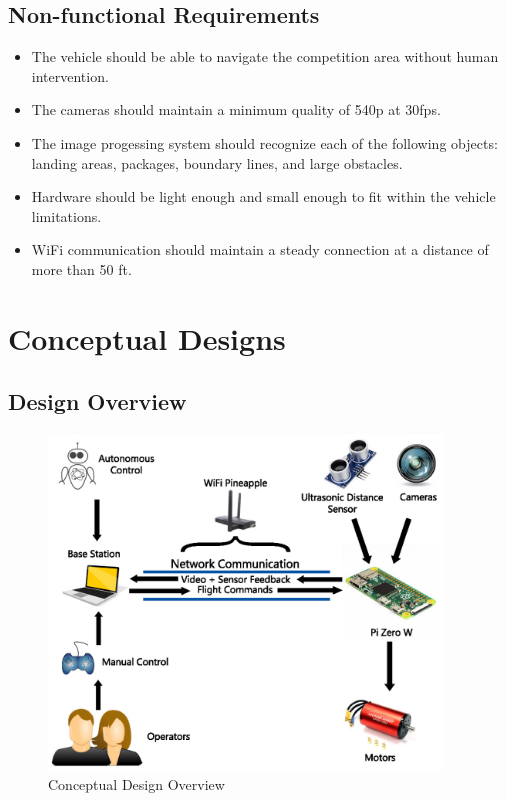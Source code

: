 \documentclass[onecolumn, draftclsnofoot,10pt, compsoc]{IEEEtran}
\begin{document}
\subsection{Non-functional Requirements} 

\begin{itemize}
\item{The vehicle should be able to navigate the competition area without human intervention.}
\item{The cameras should maintain a minimum quality of 540p at 30fps.}
\item{The image progessing system should recognize each of the following objects: landing areas, packages, boundary lines, and large obstacles.}
\item{Hardware should be light enough and small enough to fit within the vehicle limitations.}
\item{WiFi communication should maintain a steady connection at a distance of more than 50 ft. }
\end{itemize}



\section{Conceptual Designs}%


\subsection{Design Overview} %

\begin{figure}[ht]
\centering
\includegraphics[height=3.5in]{DesignOverview}
\caption{Conceptual Design Overview}
\end{figure}
\end{document}
